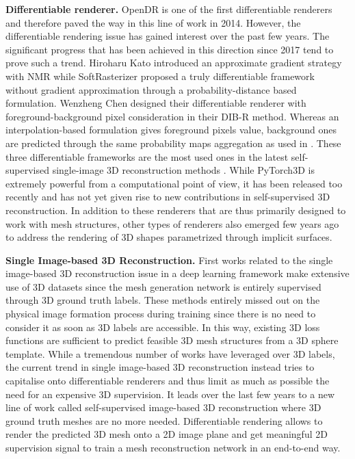 \noindent\textbf{Differentiable renderer.} OpenDR \citep{loper2014opendr} is one of the first differentiable renderers and therefore paved the way in this line of work in 2014. However, the differentiable rendering issue has gained interest over the past few years. The significant progress that has been achieved in this direction since 2017 tend to prove such a trend. Hiroharu Kato \etal introduced an approximate gradient strategy with NMR\citep{kato2018neural} while SoftRasterizer\citep{liu2019soft} proposed a truly differentiable framework without gradient approximation through a probability-distance based formulation. Wenzheng Chen \etal designed their differentiable renderer with foreground-background pixel consideration in their DIB-R \citep{chen2019learning} method. Whereas an interpolation-based formulation gives foreground pixels value, background ones are predicted through the same probability maps aggregation as used in \citep{liu2019soft}. These three differentiable frameworks are the most used ones in the latest self-supervised single-image 3D reconstruction methods \citep{kanazawa2018learning,li2020self,pavllo2020convolutional}. While PyTorch3D \citep{ravi2020accelarating} is extremely powerful from a computational point of view, it has been released too recently and has not yet given rise to new contributions in self-supervised 3D reconstruction. In addition to these renderers that are thus primarily designed to work with mesh structures, other types of renderers\citep{niemeyer2020differentiable,jiang2020sdfdiff} also emerged few years ago to address the rendering of 3D shapes parametrized through implicit surfaces. 

\noindent\textbf{Single Image-based 3D Reconstruction.} First works related to the single image-based 3D reconstruction issue in a deep learning framework \citep{choy20163d,girdhar2016learning,yang2018dense} make extensive use of 3D datasets \citep{chang2015shapenet,sun2018pix3d} since the mesh generation network is entirely supervised through 3D ground truth labels. These methods entirely missed out on the physical image formation process during training since there is no need to consider it as soon as 3D labels are accessible. In this way, existing 3D loss functions are sufficient to predict feasible 3D mesh structures from a 3D sphere template. While a tremendous number of works have leveraged over 3D labels, the current trend in single image-based 3D reconstruction instead tries to capitalise onto differentiable renderers and thus limit as much as possible the need for an expensive 3D supervision. It leads over the last few years to a new line of work called self-supervised image-based 3D reconstruction  \citep{kanazawa2018learning,li2020self,pavllo2020convolutional,henderson2020leveraging} where 3D ground truth meshes are no more needed. Differentiable rendering allows to render the predicted 3D mesh onto a 2D image plane and get meaningful 2D supervision signal to train a mesh reconstruction network in an end-to-end way. 

